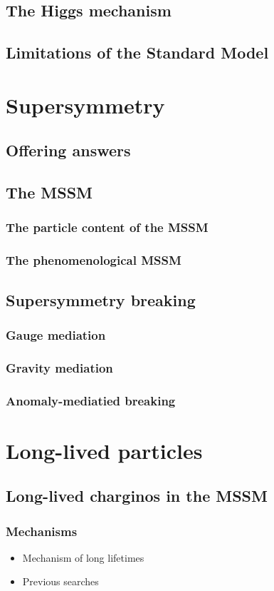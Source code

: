 \section{The Higgs mechanism}
\section{Limitations of the Standard Model}

\chapter{Supersymmetry}
\section{Offering answers}

\section{The MSSM}
\subsection{The particle content of the MSSM}
\subsection{The phenomenological MSSM}

\section{Supersymmetry breaking}
\subsection{Gauge mediation}
\subsection{Gravity mediation}
\subsection{Anomaly-mediatied breaking}

\chapter{Long-lived particles}

\section{Long-lived charginos in the MSSM}
\subsection{Mechanisms}
\begin{itemize}
\item Mechanism of long lifetimes
\item Previous searches
\end{itemize}
